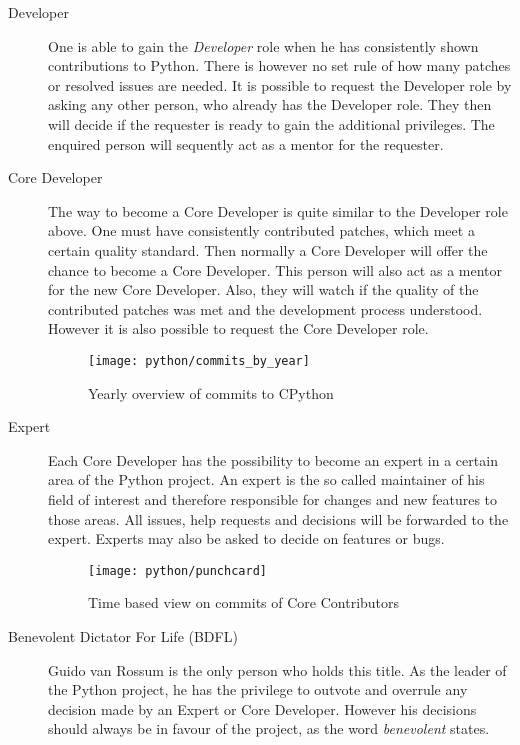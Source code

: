\begin{description}
  \item[Developer] One is able to gain the \emph{Developer} role when he has
    consistently shown contributions to Python. There is however no set rule of
    how many patches or resolved issues are needed. It is possible to request
    the Developer role by asking any other person, who already has the
    Developer role. They then will decide if the requester is ready to gain the
    additional privileges. The enquired person will sequently act as a mentor
    for the requester.
  \item[Core Developer] The way to become a Core Developer is quite similar to
    the Developer role above. One must have consistently contributed patches,
    which meet a certain quality standard. Then normally a Core Developer will
    offer the chance to become a Core Developer. This person will also act as a
    mentor for the new Core Developer. Also, they will watch if the quality of
    the contributed patches was met and the development process understood.
    However it is also possible to request the Core Developer role.

\begin{figure}[htbp]
  \centering
  \texttt{[image: python/commits\_by\_year]}
  \caption{Yearly overview of commits to CPython}
\end{figure}

  \item[Expert] Each Core Developer has the possibility to become an expert in
    a certain area of the Python project. An expert is the so called maintainer
    of his field of interest and therefore responsible for changes and new
    features to those areas. All issues, help requests and decisions will be
    forwarded to the expert. Experts may also be asked to decide on features or
    bugs.

\begin{figure}[hbtp]
  \centering
  \texttt{[image: python/punchcard]}
  \caption{Time based view on commits of Core Contributors}
\end{figure}

  \item[Benevolent Dictator For Life (BDFL)] Guido van Rossum is the only
    person who holds this title. As the leader of the Python project, he has
    the privilege to outvote and overrule any decision made by an Expert or
    Core Developer. However his decisions should always be in favour of the
    project, as the word \emph{benevolent} states.
\end{description}

